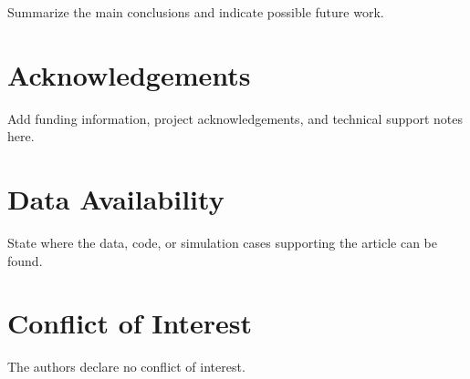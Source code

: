 \documentclass[11pt,a4paper]{article}
\begin{document}
Summarize the main conclusions and indicate possible future work.

\section*{Acknowledgements}

Add funding information, project acknowledgements, and technical support notes here.

\section*{Data Availability}

State where the data, code, or simulation cases supporting the article can be found.

\section*{Conflict of Interest}

The authors declare no conflict of interest.



\end{document}
